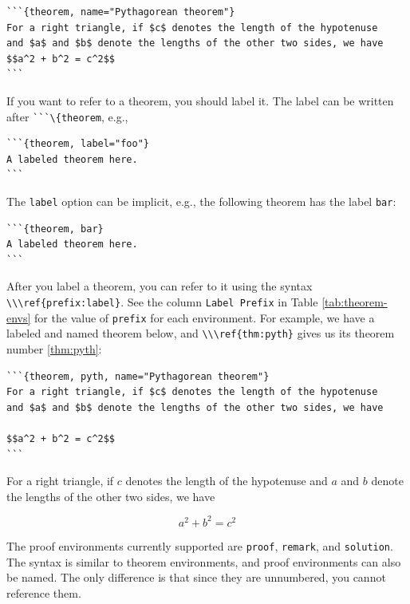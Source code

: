 \documentclass[doctor,openright,twoside]{sjtuthesis}
\newcommand{\passthrough}[1]{#1}
\theoremstyle{plain}
\theoremstyle{definition}
\theoremstyle{remark}
\theoremstyle{ocrenumbox}
\theoremstyle{plain}
\let\BeginKnitrBlock\begin \let\EndKnitrBlock\end
\begin{document}
\begin{lstlisting}
```{theorem, name="Pythagorean theorem"}
For a right triangle, if $c$ denotes the length of the hypotenuse
and $a$ and $b$ denote the lengths of the other two sides, we have
$$a^2 + b^2 = c^2$$
```
\end{lstlisting}

If you want to refer to a theorem, you should label it. The label can be written after \passthrough{\lstinline!```\{theorem!}, e.g.,

\begin{lstlisting}
```{theorem, label="foo"}
A labeled theorem here.
```
\end{lstlisting}

The \passthrough{\lstinline!label!} option can be implicit, e.g., the following theorem has the label \passthrough{\lstinline!bar!}:

\begin{lstlisting}
```{theorem, bar}
A labeled theorem here.
```
\end{lstlisting}

After you label a theorem, you can refer to it using the syntax \passthrough{\lstinline!\\\ref{prefix:label}!}. See the column \passthrough{\lstinline!Label Prefix!} in Table \ref{tab:theorem-envs} for the value of \passthrough{\lstinline!prefix!} for each environment. For example, we have a labeled and named theorem below, and \passthrough{\lstinline!\\\ref{thm:pyth}!} gives us its theorem number \ref{thm:pyth}:

\begin{lstlisting}
```{theorem, pyth, name="Pythagorean theorem"}
For a right triangle, if $c$ denotes the length of the hypotenuse
and $a$ and $b$ denote the lengths of the other two sides, we have

$$a^2 + b^2 = c^2$$
```
\end{lstlisting}

\BeginKnitrBlock{theorem}[Pythagorean theorem]
\protect\hypertarget{thm:pyth}{}{\label{thm:pyth} {} }For a right triangle, if \(c\) denotes the length of the hypotenuse
and \(a\) and \(b\) denote the lengths of the other two sides, we have

\[a^2 + b^2 = c^2\]
\EndKnitrBlock{theorem}

The proof environments currently supported are \passthrough{\lstinline!proof!}, \passthrough{\lstinline!remark!}, and \passthrough{\lstinline!solution!}. The syntax is similar to theorem environments, and proof environments can also be named. The only difference is that since they are unnumbered, you cannot reference them.
\end{document}
